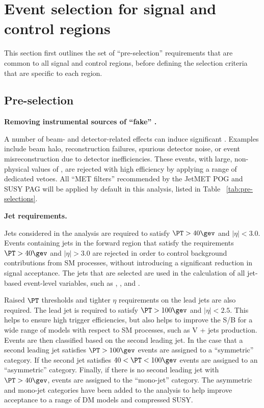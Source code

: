 \section{Event selection for signal and control regions}
\label{sec:selection}

This section first outlines the set of ``pre-selection'' requirements
that are common to all signal and control regions, before defining the
selection criteria that are specific to each region.

\subsection{Pre-selection}
\label{sec:preSelection}

{\bf Removing instrumental sources of ``fake'' \met.} 

A number of beam- and detector-related effects can induce significant
\met. Examples include beam halo, reconstruction failures, spurious
detector noise, or event misreconstruction due to detector
inefficiencies. These events, with large, non-physical values of \met,
are rejected with high efficiency by applying a range of dedicated
vetoes. All ``MET filters'' recommended by the JetMET POG and SUSY PAG
will be applied by default in this analysis, listed in Table ~\ref{tab:pre-selections}.

{\bf Jet requirements.} 

Jets considered in the analysis are required to satisfy $\PT>40\gev$
and $|\eta|<3.0$. Events containing jets in the forward region that
satisfy the requirements $\PT>40\gev$ and $|\eta|>3.0$ are rejected in
order to control background contributions from SM processes, without
introducing a significant reduction in signal acceptance. The jets
that are selected are used in the calculation of all jet-based
event-level variables, such as \HT, \mht, and \alphat.

Raised $\PT$ thresholds and tighter $\eta$ requirements on the lead jets 
are also required. The lead jet is required to satisfy $\PT > 100\gev$
and $|\eta|<2.5$. This helps to ensure high trigger efficiencies,
but also helps to improve the S/B for a wide
range of models with respect to SM processes, such as V + jets
production. Events are then classified based on the
second leading jet. In the case that a second leading jet satisfies $\PT > 100\gev$ 
events are assigned to a ``symmetric'' \njet category. If the second
jet satisfies $40 < \PT < 100\gev$ events are assigned to an
``asymmetric'' \njet category. Finally, if there is no second leading
jet with $\PT>40\gev$, events are assigned to the ``mono-jet''
category. The asymmetric and mono-jet categories have been added to
the analysis to help improve acceptance to a range of DM models and compressed
SUSY.

